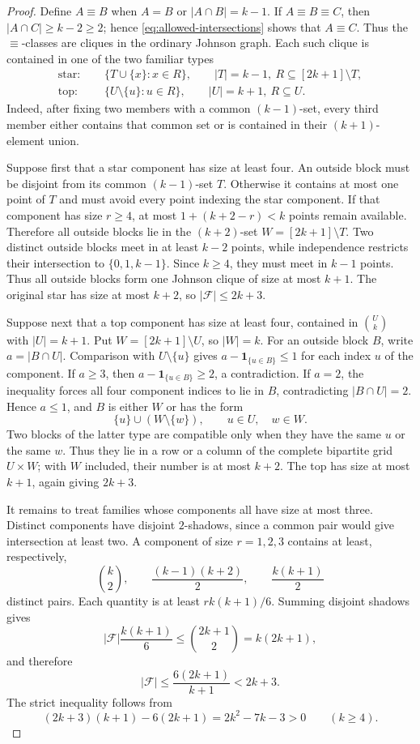 \documentclass[11pt]{article}
\theoremstyle{plain}
\theoremstyle{remark}
\newcommand{\one}{\boldsymbol{1}}
\begin{document}
\begin{proof}
Define $A\equiv B$ when $A=B$ or $|A\cap B|=k-1$.  If
$A\equiv B\equiv C$, then $|A\cap C|\ge k-2\ge2$; hence
\eqref{eq:allowed-intersections} shows that $A\equiv C$.  Thus the
$\equiv$-classes are cliques in the ordinary Johnson graph.  Each such
clique is contained in one of the two familiar types
\begin{align*}
 \text{star: }&\quad \{T\cup\{x\}:x\in R\},\qquad
 |T|=k-1,\ R\subseteq[2k+1]\setminus T,\\
 \text{top: }&\quad \{U\setminus\{u\}:u\in R\},\qquad
 |U|=k+1,\ R\subseteq U.
\end{align*}
Indeed, after fixing two members with a common $(k-1)$-set, every third
member either contains that common set or is contained in their
$(k+1)$-element union.

Suppose first that a star component has size at least four.  An outside
block must be disjoint from its common $(k-1)$-set $T$.  Otherwise it
contains at most one point of $T$ and must avoid every point indexing the
star component.  If that component has size $r\ge4$, at most
$1+(k+2-r)<k$ points remain available.
Therefore all outside blocks lie in the $(k+2)$-set
$W=[2k+1]\setminus T$.  Two distinct outside blocks meet in at least
$k-2$ points, while independence restricts their intersection to
$\{0,1,k-1\}$.  Since $k\ge4$, they must meet in $k-1$ points.  Thus all
outside blocks form one Johnson clique of size at most $k+1$.  The original
star has size at most $k+2$, so
$|\mathcal F|\le2k+3$.

Suppose next that a top component has size at least four, contained in
$\binom Uk$ with $|U|=k+1$.  Put $W=[2k+1]\setminus U$, so $|W|=k$.
For an outside block $B$, write $a=|B\cap U|$.  Comparison with
$U\setminus\{u\}$ gives $a-\one_{\{u\in B\}}\le1$ for each index $u$ of
the component.  If $a\ge3$, then
$a-\one_{\{u\in B\}}\ge2$, a contradiction.  If $a=2$, the inequality
forces all four component indices to lie in $B$, contradicting
$|B\cap U|=2$.  Hence $a\le1$, and $B$ is either $W$ or has the form
\[
 \{u\}\cup(W\setminus\{w\}),\qquad u\in U,\quad w\in W.
\]
Two blocks of the latter type are compatible only when they have the same
$u$ or the same $w$.  Thus they lie in a row or a column of the complete
bipartite grid $U\times W$; with $W$ included, their number is at most
$k+2$.  The top has size at most $k+1$, again giving $2k+3$.

It remains to treat families whose components all have size at most three.
Distinct components have disjoint $2$-shadows, since a common pair would
give intersection at least two.  A component of size $r=1,2,3$ contains at
least, respectively,
\[
 \binom{k}{2},\qquad \frac{(k-1)(k+2)}2,\qquad
 \frac{k(k+1)}2
\]
distinct pairs.  Each quantity is at least
$r k(k+1)/6$.  Summing disjoint shadows gives
\[
 |\mathcal F|\frac{k(k+1)}6
 \le \binom{2k+1}{2}=k(2k+1),
\]
and therefore
\[
 |\mathcal F|\le \frac{6(2k+1)}{k+1}<2k+3.
\]
The strict inequality follows from
\[
 (2k+3)(k+1)-6(2k+1)=2k^2-7k-3>0
 \qquad(k\ge4).
\]


\end{proof}
\end{document}
